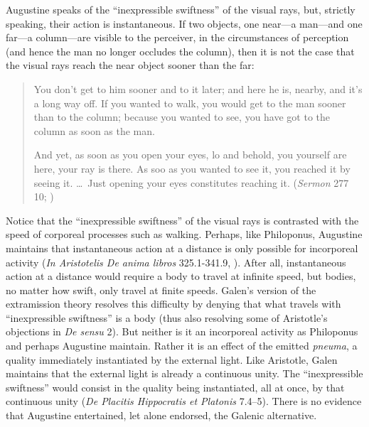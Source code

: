 \documentclass[12pt]{article}
\begin{document}
Augustine speaks of the ``inexpressible swiftness'' of the visual rays, but, strictly speaking, their action is instantaneous. If two objects, one near---a man---and one far---a column---are visible to the perceiver, in the circumstances of perception (and hence the man no longer occludes the column), then it is not the case that the visual rays reach the near object sooner than the far: 
\begin{quotation}
	You don't get to him sooner and to it later; and here he is, nearby, and it's a long way off. If you wanted to walk, you would get to the man sooner than to the column; because you wanted to see, you have got to the column as soon as the man. 
	
	And yet, as soon as you open your eyes, lo and behold, you yourself are here, your ray is there. As soo as you wanted to see it, you reached it by seeing it. \ldots\ Just opening your eyes constitutes reaching it. (\emph{Sermon} 277 10; \citealt[39]{Hill:1994aa})
\end{quotation}

Notice that the ``inexpressible swiftness'' of the visual rays is contrasted with the speed of corporeal processes such as walking. Perhaps, like Philoponus, Augustine maintains that instantaneous action at a distance is only possible for incorporeal activity (\emph{In Aristotelis De anima libros} 325.1-341.9, \citealt{Hayduck:1897aa}). After all, instantaneous action at a distance would require a body to travel at infinite speed, but bodies, no matter how swift, only travel at finite speeds. Galen's version of the extramission theory resolves this difficulty by denying that what travels with ``inexpressible swiftness'' is a body (thus also resolving some of Aristotle's objections in \emph{De sensu} 2). But neither is it an incorporeal activity as Philoponus and perhaps Augustine maintain. Rather it is an effect of the emitted \emph{pneuma}, a quality immediately instantiated by the external light. Like Aristotle, Galen maintains that the external light is already a continuous unity. The ``inexpressible swiftness'' would consist in the quality being instantiated, all at once, by that continuous unity (\emph{De Placitis Hippocratis et Platonis} 7.4--5). There is no evidence that Augustine entertained, let alone endorsed, the Galenic alternative.

\end{document}
